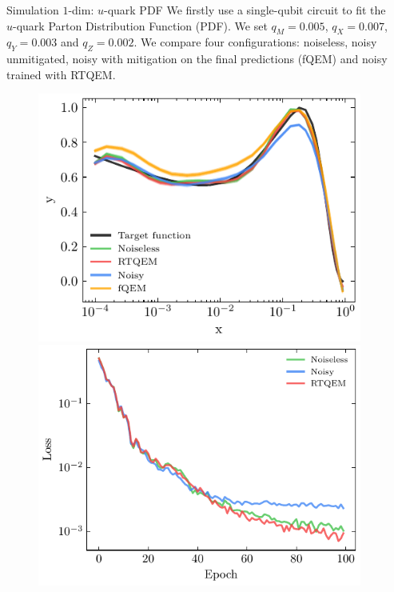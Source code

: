 \documentclass[20pt, final]{beamer}
\newlength{\colwidth}
\begin{document}
\begin{frame}[t]
\begin{columns}[t]
\begin{column}{\colwidth}
\begin{block}{Simulation $1$-dim:  $u$-quark PDF}
We firstly use a single-qubit circuit to fit the $u$-quark Parton Distribution 
Function (PDF). We set $q_M=0.005$, $q_X=0.007$, $q_Y=0.003$ and $q_Z=0.002$.
We compare four configurations: noiseless, noisy unmitigated, noisy with mitigation on 
the final predictions (fQEM) and noisy trained with RTQEM. 
\begin{figure}
  \centering
    \includegraphics[width=0.5\linewidth]{figures/qpdf.pdf}%
    \includegraphics[width=0.5\linewidth]{figures/qpdf_loss.pdf}
    \label{fig:qpdf_simulation}
  \end{figure}
\end{block}

\end{column}

\begin{column}{\colwidth}


\end{column}
\end{columns}
\end{frame}
\end{document}
